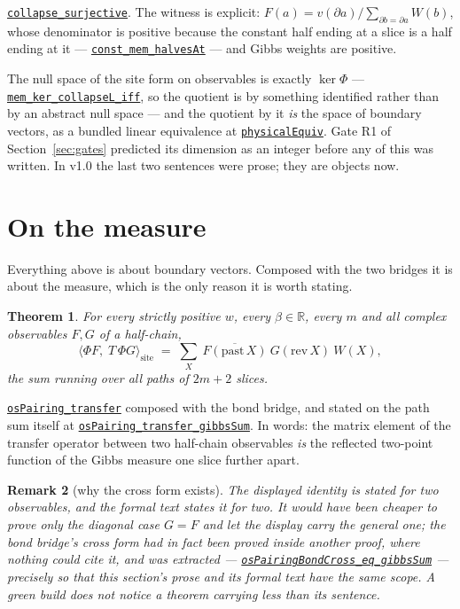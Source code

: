 \documentclass[11pt]{article}
\newtheorem{theorem}{Theorem}[section]
\newtheorem{remark}[theorem]{Remark}
\theoremstyle{definition}
\newcommand{\anchor}{c90dc745ab8cd1ba7ddc02aa16fed3de339bf958}
\newcommand{\osline}[3]{%
  \href{https://github.com/lluiseriksson/THE-ERIKSSON-PROGRAMME/blob/\anchor/YangMills/OS/#1.lean\#L#2}{\nolinkurl{#3}}}
\newcommand{\R}{\mathbb{R}}
\begin{document}
\osline{SpatialReconstruction}{230}{collapse\_surjective}.  The witness is
explicit: $F(a)=v(\partial a)\big/\sum_{\partial b=\partial a}W(b)$, whose
denominator is positive because the constant half ending at a slice is a half
ending at it --- \osline{SpatialReconstruction}{222}{const\_mem\_halvesAt}
--- and Gibbs weights are positive.

The null space of the site form on observables is exactly $\ker\Phi$ ---
\osline{SpatialReconstruction}{KERLINE}{mem\_ker\_collapseL\_iff}, so the
quotient is by something identified rather than by an abstract null space --- and
the quotient by it \emph{is} the space of boundary vectors, as a bundled linear
equivalence at \osline{SpatialReconstruction}{PHYSLINE}{physicalEquiv}.  Gate R1
of Section~\ref{sec:gates} predicted its dimension as an integer before any of
this was written.  In v1.0 the last two sentences were prose; they are objects
now.

\section{On the measure}\label{sec:measure}

Everything above is about boundary vectors.  Composed with the two bridges it is
about the measure, which is the only reason it is worth stating.

\begin{theorem}\label{thm:onmeasure}
For every strictly positive $w$, every $\beta\in\R$, every $m$ and all complex
observables $F,G$ of a half-chain,
\[
  \big\langle \Phi F,\;T\,\Phi G\big\rangle_{\mathrm{site}}
  \;=\;\sum_{X}\ \overline{F(\mathrm{past}\,X)}\ G(\mathrm{rev}\,X)\ W(X),
\]
the sum running over all paths of $2m+2$ slices.
\end{theorem}

\osline{SpatialReconstruction}{279}{osPairing\_transfer} composed with the
bond bridge, and stated on the path sum itself at
\osline{SpatialReconstruction}{294}{osPairing\_transfer\_gibbsSum}.  In
words: the matrix element of the transfer operator between two half-chain
observables \emph{is} the reflected two-point function of the Gibbs measure one
slice further apart.

\begin{remark}[why the cross form exists]
The displayed identity is stated for two observables, and the formal text states
it for two.  It would have been cheaper to prove only the diagonal case $G=F$
and let the display carry the general one; the bond bridge's cross form had in
fact been proved inside another proof, where nothing could cite it, and was
extracted --- \osline{SpatialOS}{785}{osPairingBondCross\_eq\_gibbsSum}
--- precisely so that this section's prose and its formal text have the same
scope.  A green build does not notice a theorem carrying less than its sentence.
\end{remark}
\end{document}
